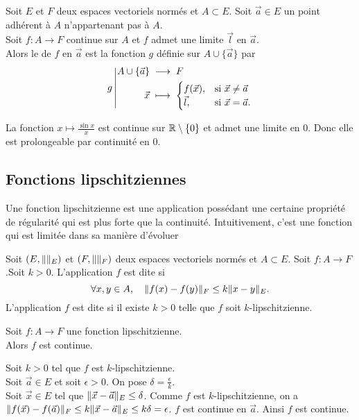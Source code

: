 \documentclass{book}
\begin{document}
\begin{DefinitionProposition}
Soit $E$ et $F$ deux espaces vectoriels normés et $A\subset E$. Soit $\vec{a}\in E$ un point adhérent à $A$ n'appartenant pas à $A$.\\
Soit $f:A\to F$ continue sur $A$ et $f$ admet une limite $\vec{l}$ en $\vec{a}$.\\
Alors le  de $f$  en $\vec{a}$ est la fonction $g$ définie sur $A\cup\{\vec{a}\}$ par
$${g}\left|\begin{aligned}{A\cup\{\vec{a}\}}&\;\longrightarrow\;{F}\\{\vec{x}}&\;\longmapsto\;{\begin{cases}f(\vec{x}),&{\mbox{si }}\vec{x}\neq \vec{a}\\\vec{l} ,&{\mbox{si }}\vec{x}=\vec{a}.\end{cases}}\end{aligned}\right.$$
\end{DefinitionProposition}
\begin{Exemple}
La fonction $x\mapsto \frac{\sin x}{x}$ est continue sur $\mathbb{R}\setminus \{0\}$ et admet une limite en 0. Donc elle est prolongeable par continuité en 0.
\end{Exemple}
\subsection{Fonctions lipschitziennes}
Une fonction lipschitzienne est une application possédant une certaine propriété de régularité qui est plus forte que la continuité. Intuitivement, c'est une fonction qui est limitée dans sa manière d'évoluer
\begin{Definition}
Soit $(E,\mathopen\lVert  \mathclose\rVert_E)$ et $(F,\mathopen\lVert  \mathclose\rVert_F)$ deux espaces vectoriels normés et $A\subset E$. Soit $f:A\to F$.Soit $k>0$. L'application $f$ est dite  si 
$$\forall x,y\in A,\quad\mathopen\lVert f(x)-f(y) \mathclose\rVert_F\leq k \mathopen\lVert x-y \mathclose\rVert_E.$$
L'application $f$ est dite  si il existe $k>0$ telle que $f$ soit $k$-lipschitzienne.
\end{Definition}
\begin{Proposition}
Soit $f:A\to F$ une fonction lipschitzienne.\\
Alors $f$ est continue. 
\end{Proposition}
\begin{Demonstration}
Soit $k>0$ tel que $f$ est $k$-lipschitzienne.\\
Soit $ \vec{a} \in E$ et soit $\epsilon > 0$.
On pose $\delta=\frac{\epsilon}{k}$.\\
Soit $\vec{x}\in E$ tel que  $\mathopen\lVert \vec{x}-\vec{a} \mathclose\rVert_E\leq\delta$.
Comme  $f$ est $k$-lipschitzienne, on a $\mathopen\lVert f(\vec{x})-f(\vec{a}) \mathclose\rVert_F\leq k \mathopen\lVert \vec{x}-\vec{a} \mathclose\rVert_E \leq k \delta=\epsilon$. $f$ est continue en $ \vec{a}$. Ainsi $f$ est continue. 
\end{Demonstration}
\end{document}
